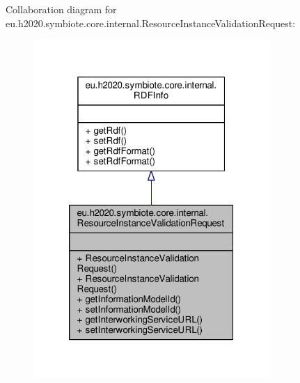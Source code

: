 Collaboration diagram for eu.\+h2020.\+symbiote.\+core.\+internal.\+Resource\+Instance\+Validation\+Request\+:
\nopagebreak
\begin{figure}[H]
\begin{center}
\leavevmode
\includegraphics[width=254pt]{classeu_1_1h2020_1_1symbiote_1_1core_1_1internal_1_1ResourceInstanceValidationRequest__coll__graph}
\end{center}
\end{figure}
